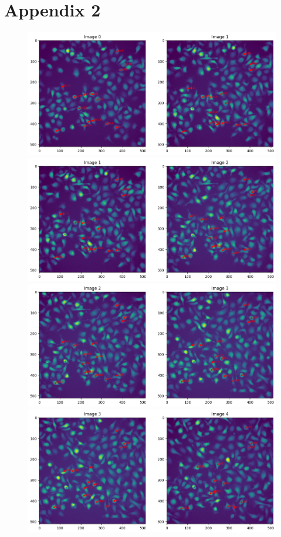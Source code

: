 \documentclass{article}
\begin{document}
\section*{Appendix 2}


\begin{figure}[h!]
\centering
\includegraphics[width=0.75\linewidth]{Report/RImages/Traces_Growth/trace-b1.png}
\includegraphics[width=0.75\linewidth]{Report/RImages/Traces_Growth/trace-b2.png}
\includegraphics[width=0.75\linewidth]{Report/RImages/Traces_Growth/trace-b3.png}
\includegraphics[width=0.75\linewidth]{Report/RImages/Traces_Growth/trace-b4.png}
\end{figure}
\end{document}
